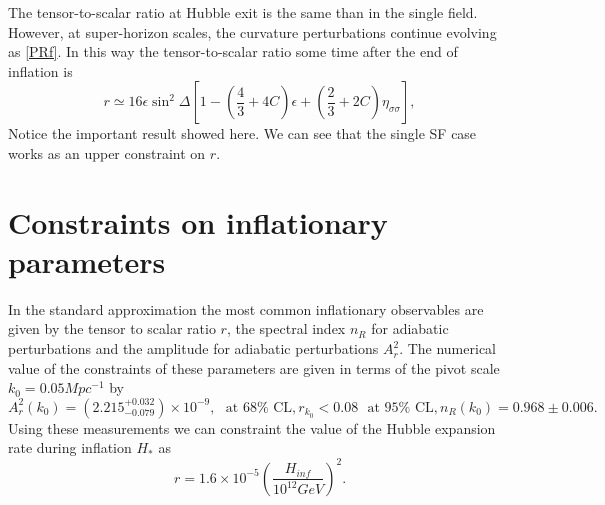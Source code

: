 \documentclass[amssymb,twocolumn,prd,nofootinbib,showpacs]{revtex4-1}
\begin{document}
The tensor-to-scalar ratio at Hubble exit is the same than in the single field. However, at super-horizon scales, the curvature perturbations continue evolving as \eqref{PRf}. In this way the tensor-to-scalar ratio some time after the end of inflation is
\begin{equation}\label{Tensortoscalar}
r\simeq 16\epsilon \sin^2\Delta\left[1-\left(\frac{4}{3}+4C\right)\epsilon +\left(\frac{2}{3}+2C\right)\eta_{\sigma\sigma}\right],
\end{equation}
Notice the important result showed here. We can see that the single SF case works as an upper constraint on $r$.
\section{Constraints on inflationary parameters}\label{experimentos}

In the standard approximation the most common inflationary observables are given by the tensor to scalar ratio $r$, the spectral index $n_R$ for adiabatic perturbations and the amplitude for adiabatic perturbations $A_r^2$.  The numerical value of the constraints of these parameters are given in terms of the pivot scale $k_0=0.05 Mpc^{-1}$ by \cite{const1,const2,planck,const3,const4,const5}
\begin{subequations}
\begin{equation}\label{amplitude}
A_r^2(k_0)=(2.215^{+0.032}_{-0.079})\times 10^{-9}, \ \ \ \text{at $68\%$ CL},
\end{equation}
\begin{equation}
r_{k_0}<0.08 \ \ \ \text{at $95\%$ CL},
\end{equation}
\begin{equation}\label{n_R}
n_R(k_0)=0.968 \pm 0.006.
\end{equation}
\end{subequations}
Using these measurements we can constraint the value of the Hubble expansion rate during inflation $H_*$ as \cite{H1,H2}
\begin{equation}\label{Hinf}
r = 1.6\times 10^{-5}\left(\frac{H_{inf}}{10^{12}GeV}\right)^2.
\end{equation}
\end{document}
